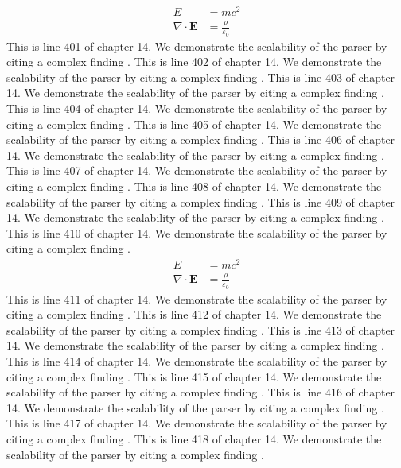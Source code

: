 \begin{align*}
  E &= mc^2 \\
  \nabla \cdot \mathbf{E} &= \frac{\rho}{\varepsilon_0}
\end{align*}
This is line 401 of chapter 14. We demonstrate the scalability of the parser by citing a complex finding \cite{ref14_401}.
This is line 402 of chapter 14. We demonstrate the scalability of the parser by citing a complex finding \cite{ref14_402}.
This is line 403 of chapter 14. We demonstrate the scalability of the parser by citing a complex finding \cite{ref14_403}.
This is line 404 of chapter 14. We demonstrate the scalability of the parser by citing a complex finding \cite{ref14_404}.
This is line 405 of chapter 14. We demonstrate the scalability of the parser by citing a complex finding \cite{ref14_405}.
This is line 406 of chapter 14. We demonstrate the scalability of the parser by citing a complex finding \cite{ref14_406}.
This is line 407 of chapter 14. We demonstrate the scalability of the parser by citing a complex finding \cite{ref14_407}.
This is line 408 of chapter 14. We demonstrate the scalability of the parser by citing a complex finding \cite{ref14_408}.
This is line 409 of chapter 14. We demonstrate the scalability of the parser by citing a complex finding \cite{ref14_409}.
This is line 410 of chapter 14. We demonstrate the scalability of the parser by citing a complex finding \cite{ref14_410}.
\begin{align*}
  E &= mc^2 \\
  \nabla \cdot \mathbf{E} &= \frac{\rho}{\varepsilon_0}
\end{align*}
This is line 411 of chapter 14. We demonstrate the scalability of the parser by citing a complex finding \cite{ref14_411}.
This is line 412 of chapter 14. We demonstrate the scalability of the parser by citing a complex finding \cite{ref14_412}.
This is line 413 of chapter 14. We demonstrate the scalability of the parser by citing a complex finding \cite{ref14_413}.
This is line 414 of chapter 14. We demonstrate the scalability of the parser by citing a complex finding \cite{ref14_414}.
This is line 415 of chapter 14. We demonstrate the scalability of the parser by citing a complex finding \cite{ref14_415}.
This is line 416 of chapter 14. We demonstrate the scalability of the parser by citing a complex finding \cite{ref14_416}.
This is line 417 of chapter 14. We demonstrate the scalability of the parser by citing a complex finding \cite{ref14_417}.
This is line 418 of chapter 14. We demonstrate the scalability of the parser by citing a complex finding \cite{ref14_418}.
